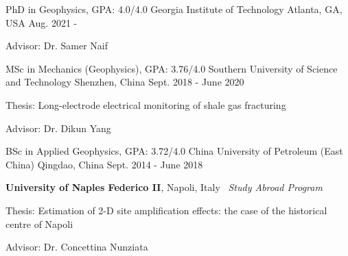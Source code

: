 

\begin{cventries}

  \cventry
    {PhD in Geophysics, GPA: 4.0/4.0} %
    {Georgia Institute of Technology} %
    {Atlanta, GA, USA} %
    {Aug. 2021 - } %
    {
      \begin{cvitems} %
        \item {Advisor: Dr. Samer Naif}
      \end{cvitems}
    }

  \cventry
    {MSc in Mechanics (Geophysics), GPA: 3.76/4.0} %
    {Southern University of Science and Technology} %
    {Shenzhen, China} %
    {Sept. 2018 - June 2020} %
    {
      \begin{cvitems} %
        \item {Thesis: Long-electrode electrical monitoring of shale gas fracturing}
        \item {Advisor: Dr. Dikun Yang}
      \end{cvitems}
    }

  \cventry
    {BSc in Applied Geophysics, GPA: 3.72/4.0} %
    {China University of Petroleum (East China)} %
    {Qingdao, China} %
    {Sept. 2014 - June 2018} %
    {
      \begin{cvitems} %
        \item {\textbf{University of Naples Federico II}, Napoli, Italy \textemdash \, \itshape Study Abroad Program}
        \item {Thesis: Estimation of 2-D site amplification effects: the case of the historical centre of Napoli}
        \item {Advisor: Dr. Concettina Nunziata}
      \end{cvitems}
    }

\end{cventries}
